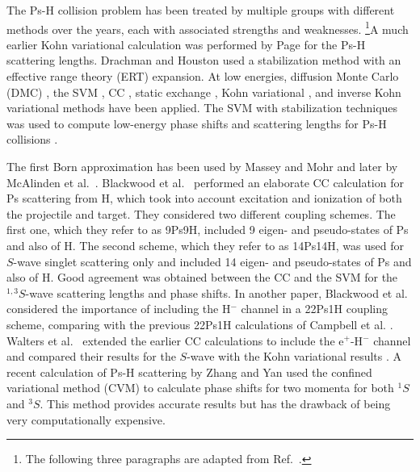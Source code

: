 \documentclass[Dissertation.tex]{subfiles}
\begin{document}
The Ps-H collision problem has been treated by multiple groups with different
methods over the years, each with associated strengths and weaknesses.
\footnote{The following three paragraphs are adapted from Ref.~\cite{Woods2015}.}A much 
earlier Kohn variational calculation was performed by Page \cite{Page1976} 
for the Ps-H scattering lengths. Drachman and Houston
\cite{Drachman1975,Drachman1976} used
a stabilization method with an effective range theory (ERT) expansion.
At low energies, diffusion Monte Carlo (DMC)
\cite{Chiesa2002}, the SVM \cite{Ivanov2001,Ivanov2002}, CC
\cite{Sinha1997,Campbell1998,Adhikari1999,Sinha2000,Blackwood2002,Blackwood2002b,Walters2004},
static exchange \cite{Hara1975,Ray1997,*Ray1996}, Kohn variational
\cite{Page1976,VanReeth2003,VanReeth2004}, and inverse Kohn
variational \cite{VanReeth2003,VanReeth2004} methods have been applied. The SVM
with stabilization 
techniques was used to compute low-energy phase shifts and 
scattering lengths for Ps-H collisions \cite{Ivanov2001,Ivanov2002}.

The first Born approximation has been used by Massey and Mohr \cite{Massey1954}
and later by McAlinden et al.~\cite{McAlinden1996}.
Blackwood et al.~\cite{Blackwood2002} performed an elaborate CC calculation 
for Ps scattering from H, which took into account excitation and ionization 
of both the projectile and target. They considered two different coupling 
schemes. The first one, which they refer to as 9Ps9H, included 9 eigen- and 
pseudo-states of Ps and also of H. The second scheme, which they refer to as 
14Ps14H, was used for $S$-wave singlet scattering only and included
14 eigen- and pseudo-states of 
Ps and also of H. Good agreement was obtained between the CC
\cite{Blackwood2002} and the SVM \cite{Ivanov2002} for the $^{1,3}S$-wave scattering
lengths and phase shifts. In another paper, Blackwood et
al.~\cite{Blackwood2002b} considered the importance of including the H$^-$
channel in a 22Ps1H coupling scheme, comparing with the previous 22Ps1H
calculations of Campbell et al. \cite{Campbell1998}. Walters et
al.~\cite{Walters2004} extended the earlier CC calculations
\cite{Blackwood2002} to include the e$^+$-H$^-$ channel
\cite{Blackwood2002b} and compared their results for the $S$-wave with the
Kohn variational results \cite{VanReeth2003}.
A recent calculation of Ps-H scattering by Zhang and Yan
\cite{Zhang2012} used the
confined variational method (CVM) to calculate phase shifts for two momenta
for both $^1S$ and $^3S$. This method provides accurate
results but has the drawback of being very computationally expensive.
\end{document}
